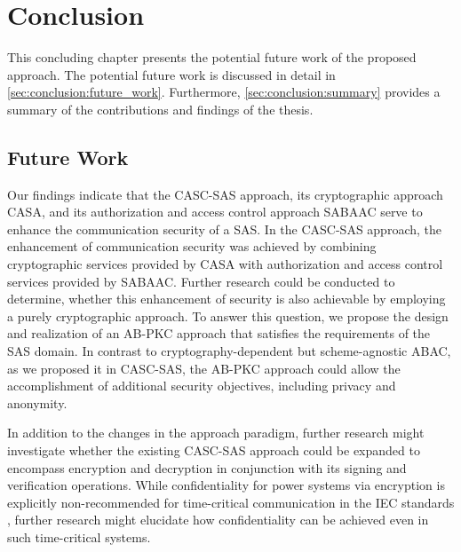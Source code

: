 \chapter{Conclusion}
\label{ch:conclusion}
This concluding chapter presents the potential future work of the proposed approach.
The potential future work is discussed in detail in \autoref{sec:conclusion:future_work}.
Furthermore, \autoref{sec:conclusion:summary} provides a summary of the contributions and findings of the thesis.

\section{Future Work}
\label{sec:conclusion:future_work}
Our findings indicate that the CASC-SAS approach, its cryptographic approach CASA, and its authorization and access control approach SABAAC serve to enhance the communication security of a SAS.
In the CASC-SAS approach, the enhancement of communication security was achieved by combining cryptographic services provided by CASA with authorization and access control services provided by SABAAC.
Further research could be conducted to determine, whether this enhancement of security is also achievable by employing a purely cryptographic approach.
To answer this question, we propose the design and realization of an AB-PKC approach that satisfies the requirements of the SAS domain.
In contrast to cryptography-dependent but scheme-agnostic ABAC, as we proposed it in CASC-SAS, the AB-PKC approach could allow the accomplishment of additional security objectives, including privacy and anonymity.

In addition to the changes in the approach paradigm, further research might investigate whether the existing CASC-SAS approach could be expanded to encompass encryption and decryption in conjunction with its signing and verification operations.
While confidentiality for power systems via encryption is explicitly non-recommended for time-critical communication in the IEC standards \cite{IEC62351P6}, further research might elucidate how confidentiality can be achieved even in such time-critical systems.

